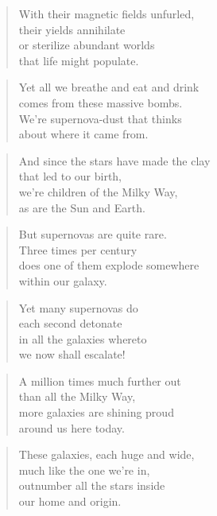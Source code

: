 \documentclass[10pt,a4paper]{article}
\begin{document}
\begin{multicols}{2}
\begin{verse}
With their magnetic fields unfurled,\\
their yields annihilate\\
or sterilize abundant worlds\\
that life might populate.
\end{verse}

\begin{verse}
Yet all we breathe and eat and drink\\
comes from these massive bombs.\\
We’re supernova-dust that thinks\\
about where it came from.
\end{verse}

\begin{verse}
And since the stars have made the clay\\
that led to our birth,\\
we’re children of the Milky Way,\\
as are the Sun and Earth.
\end{verse}

\begin{verse}
But supernovas are quite rare.\\
Three times per century\\
does one of them explode somewhere\\
within our galaxy.
\end{verse}

\begin{verse}
Yet many supernovas do\\
each second detonate\\
in all the galaxies whereto\\
we now shall escalate!
\end{verse}

\begin{verse}
A million times much further out\\
than all the Milky Way,\\
more galaxies are shining proud\\
around us here today.
\end{verse}

\begin{verse}
These galaxies, each huge and wide,\\
much like the one we’re in,\\
outnumber all the stars inside\\
our home and origin.
\end{verse}


\end{multicols}
\end{document}
